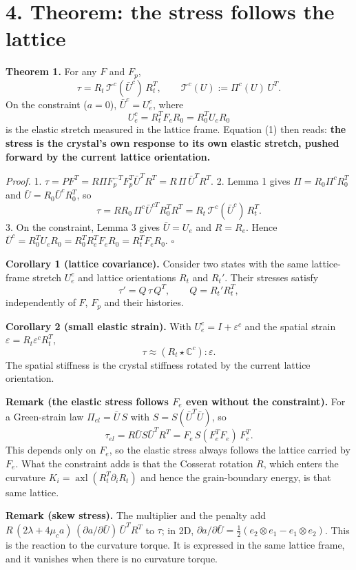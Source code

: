 \documentclass[
  11pt,
]{article}
\begin{document}
\hypertarget{theorem-the-stress-follows-the-lattice}{%
\section{4. Theorem: the stress follows the
lattice}\label{theorem-the-stress-follows-the-lattice}}

\textbf{Theorem 1.} For any \(F\) and \(F_p\),
\[\tau=R_t\,\mathcal T^c(\bar U^c)\,R_t^T,\qquad \mathcal T^c(U):=\Pi^c(U)\,U^T. \tag{1}\]
On the constraint (\(a=0\)), \(\bar U^c=U_e^c\), where
\[U_e^c=R_t^TF_eR_0=R_0^TU_eR_0 \tag{2}\] is the elastic stretch
measured in the lattice frame. Equation (1) then reads: \textbf{the
stress is the crystal's own response to its own elastic stretch, pushed
forward by the current lattice orientation.}

\emph{Proof.} 1.
\(\tau=PF^T=R\Pi F_p^{-T}F_p^T\bar U^TR^T=R\,\Pi\,\bar U^TR^T\). 2.
Lemma 1 gives \(\Pi=R_0\Pi^cR_0^T\) and \(\bar U=R_0\bar U^cR_0^T\), so
\[\tau=RR_0\,\Pi^c\bar U^{cT}R_0^TR^T=R_t\,\mathcal T^c(\bar U^c)\,R_t^T .\]
3. On the constraint, Lemma 3 gives \(\bar U=U_e\) and \(R=R_e\). Hence
\(\bar U^c=R_0^TU_eR_0=R_0^TR_e^TF_eR_0=R_t^TF_eR_0\). \(\square\)

\textbf{Corollary 1 (lattice covariance).} Consider two states with the
same lattice-frame stretch \(U_e^c\) and lattice orientations \(R_t\)
and \(R_t'\). Their stresses satisfy
\[\tau'=Q\,\tau\,Q^T,\qquad Q=R_t'R_t^T,\] independently of \(F\),
\(F_p\) and their histories.

\textbf{Corollary 2 (small elastic strain).} With
\(U_e^c=I+\varepsilon^c\) and the spatial strain
\(\varepsilon=R_t\varepsilon^cR_t^T\),
\[\tau\approx(R_t\star\mathbb C^c):\varepsilon .\] The spatial stiffness
is the crystal stiffness rotated by the current lattice orientation.

\textbf{Remark (the elastic stress follows \(F_e\) even without the
constraint).} For a Green-strain law \(\Pi_{el}=\bar U\,S\) with
\(S=S(\bar U^T\bar U)\), so
\[\tau_{el}=R\bar US\bar U^TR^T=F_e\,S(F_e^TF_e)\,F_e^T .\] This depends
only on \(F_e\), so the elastic stress always follows the lattice
carried by \(F_e\). What the constraint adds is that the Cosserat
rotation \(R\), which enters the curvature
\(K_i=\operatorname{axl}(R_t^T\partial_iR_t)\) and hence the
grain-boundary energy, is that same lattice.

\textbf{Remark (skew stress).} The multiplier and the penalty add
\(R\,(2\lambda+4\mu_c a)\,(\partial a/\partial\bar U)\,\bar U^TR^T\) to
\(\tau\); in 2D,
\(\partial a/\partial\bar U=\tfrac12(e_2\otimes e_1-e_1\otimes e_2)\).
This is the reaction to the curvature torque. It is expressed in the
same lattice frame, and it vanishes when there is no curvature torque.
\end{document}
